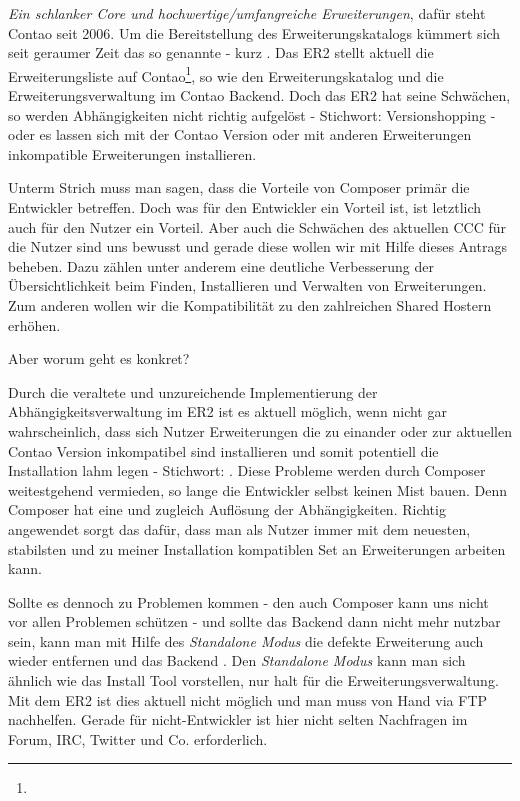 \documentclass[
paper=a4,
draft=false,%
fontsize=10pt%
]{scrartcl}
\begin{document}
\textit{Ein schlanker Core und hochwertige/umfangreiche Erweiterungen}, dafür steht Contao seit 2006. Um die Bereitstellung des Erweiterungskatalogs kümmert sich seit geraumer Zeit das so genannte  - kurz . Das ER2 stellt aktuell die Erweiterungsliste auf Contao\footnote{}, so wie den Erweiterungskatalog und die Erweiterungsverwaltung im Contao Backend. Doch das ER2 hat seine Schwächen, so werden Abhängigkeiten nicht richtig aufgelöst - Stichwort: Versionshopping - oder es lassen sich mit der Contao Version oder mit anderen Erweiterungen inkompatible Erweiterungen installieren.

Unterm Strich muss man sagen, dass die Vorteile von Composer primär die Entwickler betreffen. Doch was für den Entwickler ein Vorteil ist, ist letztlich auch für den Nutzer ein Vorteil. Aber auch die Schwächen des aktuellen CCC für die Nutzer sind uns bewusst und gerade diese wollen wir mit Hilfe dieses Antrags beheben. Dazu zählen unter anderem eine deutliche Verbesserung der Übersichtlichkeit beim Finden, Installieren und Verwalten von Erweiterungen. Zum anderen wollen wir die Kompatibilität zu den zahlreichen Shared Hostern erhöhen.

Aber worum geht es konkret?

Durch die veraltete und unzureichende Implementierung der Abhängigkeitsverwaltung im ER2 ist es aktuell möglich, wenn nicht gar wahrscheinlich, dass sich Nutzer Erweiterungen die zu einander oder zur aktuellen Contao Version inkompatibel sind installieren und somit potentiell die Installation lahm legen - Stichwort: . Diese Probleme werden durch Composer weitestgehend vermieden, so lange die Entwickler selbst keinen Mist bauen. Denn Composer hat eine  und zugleich  Auflösung der Abhängigkeiten. Richtig angewendet sorgt das dafür, dass man als Nutzer immer mit dem neuesten, stabilsten und zu meiner Installation kompatiblen Set an Erweiterungen arbeiten kann.

Sollte es dennoch zu Problemen kommen - den auch Composer kann uns nicht vor allen Problemen schützen - und sollte das Backend dann nicht mehr nutzbar sein, kann man mit Hilfe des \textit{Standalone Modus} die defekte Erweiterung auch wieder entfernen und das Backend . Den \textit{Standalone Modus} kann man sich ähnlich wie das Install Tool vorstellen, nur halt für die Erweiterungsverwaltung. Mit dem ER2 ist dies aktuell nicht möglich und man muss von Hand via FTP nachhelfen. Gerade für nicht-Entwickler ist hier nicht selten Nachfragen im Forum, IRC, Twitter und Co. erforderlich.
\end{document}
